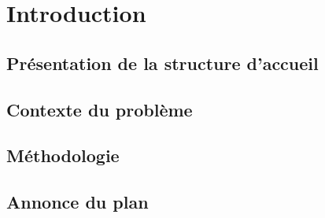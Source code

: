 \hypertarget{Introduction}{%
\chapter{Introduction}\label{Introduction}}

\section{Présentation de la structure
d'accueil}


\hypertarget{Contexte du problème}{%
\section{Contexte du problème}\label{problematique}}


\hypertarget{Méthodologie}{%
\section{Méthodologie}\label{Méthodologie}}

\hypertarget{Annonce du plan}{%
\section{Annonce du plan}\label{annonce du plan}}
